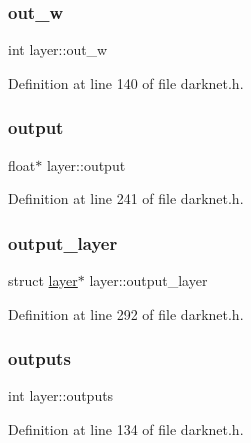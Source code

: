 \mbox{\label{structlayer_a46454d978f2d84f8b8aba918a747c761}} 
\subsubsection{\texorpdfstring{out\_w}{out\_w}}
{\footnotesize\ttfamily int layer\+::out\+\_\+w}



Definition at line 140 of file darknet.\+h.

\mbox{\label{structlayer_a04d23c71428242b3153eda588f844eb3}} 
\subsubsection{\texorpdfstring{output}{output}}
{\footnotesize\ttfamily float$\ast$ layer\+::output}



Definition at line 241 of file darknet.\+h.

\mbox{\label{structlayer_a93e590cb5d7d1cb0ff4803cd15dd0b51}} 
\subsubsection{\texorpdfstring{output\_layer}{output\_layer}}
{\footnotesize\ttfamily struct \mbox{\hyperlink{structlayer}{layer}}$\ast$ layer\+::output\+\_\+layer}



Definition at line 292 of file darknet.\+h.

\mbox{\label{structlayer_a0874fab782ae0e8f1075cc99d776478b}} 
\subsubsection{\texorpdfstring{outputs}{outputs}}
{\footnotesize\ttfamily int layer\+::outputs}



Definition at line 134 of file darknet.\+h.

\mbox{\label{structlayer_ac7f6c035a8161713696db818f4dcb6ea}} 
